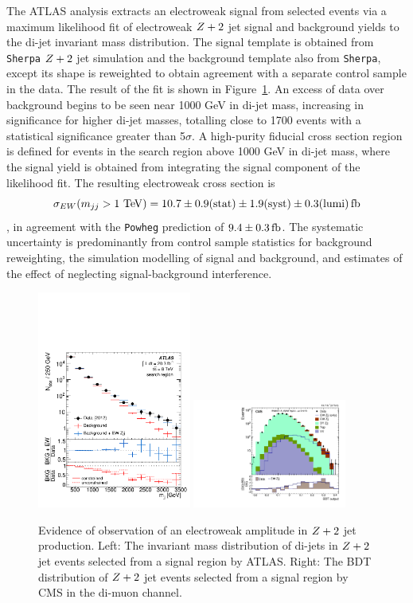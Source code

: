 The ATLAS analysis extracts an electroweak signal from selected events via a maximum likelihood fit
of electroweak $Z+2$ jet signal and background yields to the di-jet invariant mass distribution.
The signal template is obtained from \texttt{Sherpa} $Z+2$ jet simulation and the background template also from \texttt{Sherpa},
except its shape is reweighted to obtain agreement with a separate control sample in the data.
The result of the fit is shown in Figure~\ref{fig:ss-exclboson-z2j-8tev}.  An excess of data over background begins to be seen
near 1000 GeV in di-jet mass, increasing in significance for higher di-jet masses, totalling close to 1700 events with a statistical
significance greater than 5$\sigma$.   A high-purity fiducial cross section region is defined for events in the search
region above 1000 GeV in di-jet mass, where the signal yield is obtained from integrating the signal component of the likelihood fit.
The resulting electroweak cross section is
$$\sigma_{EW} (m_{jj} > 1 \TeV) = 10.7 \pm 0.9 \rm{(stat)} \pm 1.9 \rm{(syst)} \pm 0.3 \rm{(lumi)} \rm{\,fb}$$,
in agreement with the \texttt{Powheg} prediction of $9.4\pm0.3 \rm{\,fb}$.  The systematic uncertainty is predominantly from
control sample statistics for background reweighting, the simulation modelling of signal and background,
and estimates of the effect of neglecting signal-background interference.

\begin{figure}[p]
    \centering
    \includegraphics[width=0.45\textwidth]{figures/ss-exclboson-z2j-atlas8tev.pdf}
    \includegraphics[width=0.45\textwidth]{figures/ss-exclboson-z2j-cms8tev.pdf}
    \caption{Evidence of observation of an electroweak amplitude in $Z+2$ jet production.
    Left:  The invariant mass distribution of di-jets in $Z+2$ jet events selected
     from a signal region by ATLAS.
    Right:  The BDT distribution of $Z+2$ jet events selected from a signal region
    by CMS in the di-muon channel.}
    \label{fig:ss-exclboson-z2j-8tev}
\end{figure}

